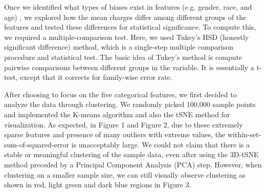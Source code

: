 \documentclass[10pt,twocolumn,letterpaper]{article}
\begin{document}
Once we identified what types of biases exist in features (e.g. gender, race, and age) , we explored how the mean charges differ among different groups of the features and tested these differences for statistical significance. To compute this, we required a multiple-comparison test. Here, we used Tukey’s HSD (honestly significant difference) method, which is a single-step multiple comparison procedure and statistical test. The basic idea of Tukey’s method is compute pairwise comparisons between different groups in the variable. It is essentially a t-test, except that it corrects for family-wise error rate.


After choosing to focus on the five categorical features, we first decided to analyze the data through clustering. We randomly picked 100,000 sample points and implemented the K-means algorithm and also the tSNE method for visualization. As expected, in Figure 1 and Figure 2, due to these extremely sparse features and presence of many outliers with extreme values, the within-set-sum-of-squared-error is unacceptably large. We could not claim that there is a stable or meaningful clustering of the sample data, even after using the 3D-tSNE method preceded by a Principal Component Analysis (PCA) step. However, when clustering on a smaller sample size, we can still visually observe clustering as shown in red, light green and dark blue regions in Figure 3.
\end{document}
